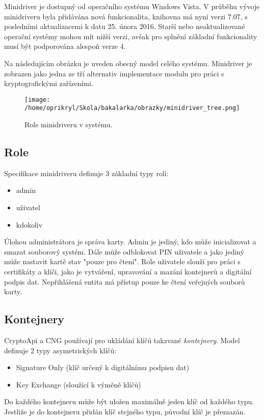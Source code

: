\documentclass[]{fithesis3}
\begin{document}
	Minidriver je dostupný od operačního systému Windows Vista. V průběhu vývoje minidriveru byla		přidávána nová funkcionalita, knihovna má nyní verzi 7.07, s posledními aktualizacemi k datu 		25. února 2016. Starší nebo neaktualizované operační systémy mohou mít nižší verzi, avšak 		pro splnění základní funkcionality musí být podporována alespoň verze 4. \newline

	Na následujícím obrázku je uveden obecný model celého systému. Minidriver je zobrazen jako 		jedna ze tří alternativ implementace modulu pro práci s kryptografickými zařízeními. 

		\begin{figure}[!ht]
  			\begin{minipage}{1.00\textwidth}
    				\texttt{[image: /home/oprikryl/Skola/bakalarka/obrazky/minidriver\_tree.png]}
  			\end{minipage}
 			\caption{Role minidriveru v systému.}
  			\label{fig:Role minidriveru v systému.}
		\end{figure}	

		\subsection{Role}
		
		Specifikace minidriveru definuje 3 základní typy rolí:
		\begin{itemize}
			\item admin
			\item uživatel
			\item kdokoliv
		\end{itemize}
		Úlohou administrátora je správa karty. Admin je jediný, kdo může inicializovat a smazat 				souborový systém. Dále může odblokovat PIN uživatele a jako jediný může nastavit 				kartě stav "pouze pro čtení". Role uživatele slouží pro práci s certifikáty a klíči, jako je 				vytváření, upravování a mazání kontejnerů a digitální podpis dat. Nepřihlášená entita má 			přístup pouze ke čtení veřejných souborů karty.

		\subsection{Kontejnery}
		CryptoApi a CNG používají pro ukládání klíčů takzvané \textit{kontejnery}. Model definuje 			2 typy asymetrických klíčů:
		\begin{itemize}
			\item Signature Only (klíč určený k digitálnímu podpisu dat)
			\item  Key Exchange (sloužící k výměně klíčů)
		\end{itemize}		
		Do každého kontejneru může být uložen maximálně jeden klíč od každého typu. Jestliže je 			do kontejneru přidán klíč stejného typu, původní klíč je přemazán.
\end{document}
